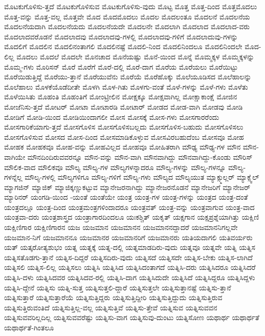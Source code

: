 {ಮೊಟಕುಗೊಳಿಸು-ತ್ತದೆ
ಮೊಟಕುಗೊಳಿಸುವ
ಮೊಟಕುಗೊಳಿಸು-ವುದು
ಮೊಟ್ಟ
ಮೊತ್ತ
ಮೊತ್ತ-ದಿಂದ
ಮೊತ್ತಮೊದಲು
ಮೊತ್ತ-ವನ್ನು
ಮೊತ್ತ-ವಲ್ಲ
ಮೊತ್ತವೇ
ಮೊದ
ಮೊದಮೊದಲು
ಮೊದಲ
ಮೊದಲಂತೂ
ಮೊದಲನೆ
ಮೊದಲನೆಯ
ಮೊದಲನೆಯದಾಗಿ
ಮೊದಲನೆಯದು
ಮೊದಲನೆಯದೇ
ಮೊದಲನೇ
ಮೊದಲಾಗಿ
ಮೊದಲಾದ
ಮೊದಲಾದ-ವರು
ಮೊದಲಾದವರೊಡನೆ
ಮೊದಲಾದವು
ಮೊದಲಾದವು-ಗಳಲ್ಲಿ
ಮೊದಲಾದವು-ಗಳಿಗೆ
ಮೊದಲಾದುವು-ಗಳನ್ನು
ಮೊದಲಿಗೆ
ಮೊದಲಿನ
ಮೊದಲಿನಂತಾಗಲಿ
ಮೊದಲಿನಷ್ಟೆ
ಮೊದಲಿ-ನಿಂದ
ಮೊದಲಿನಿಂದಲೂ
ಮೊದಲಿನಿಂದಲೇ
ಮೊದ-ಲಿಲ್ಲ
ಮೊದಲು
ಮೊದಲೆ
ಮೊದಲೇ
ಮೊನಚಾದ
ಮೊನೆಯಷ್ಟು
ಮೊನೆ-ಯಿಂದ
ಮೊನ್ನೆ
ಮೊಮ್ಮಕ್ಕಳ
ಮೊಮ್ಮಕ್ಕಳನ್ನು
ಮೊಮ್ಮ-ಗಳು
ಮೊರಿಸನ್
ಮೊರೆ
ಮೊರೆಗೆ
ಮೊರೆ-ದಲ್ಲಿ
ಮೊರೆ-ದಾಗ
ಮೊರೆಯ
ಮೊರೆಯಲು
ಮೊರೆಯಿಟ್ಟು
ಮೊರೆಯಿಡುತ್ತಿದ್ದೆ
ಮೊರೆಯು-ತ್ತಾನೆ
ಮೊರೆಯುವೆನು
ಮೊರೆಯೆ
ಮೊರೆಹೊಕ್ಕು
ಮೊಲೆಯೂಡಿಸದ
ಮೊಲೆಹಾಲನ್ನು
ಮೊಲೆಹಾಲು
ಮೊಳಕೆಯೊಡೆದೀತೇ
ಮೊಳಗಿ
ಮೊಳ-ಗಿತು
ಮೊಳಗು-ವಂತೆ
ಮೊಳೆ-ಗಳನ್ನು
ಮೊಳೆ-ಗಳು
ಮೊಳೆತು
ಮೊಳೆಯಿಸಿತು
ಮೊಹಂತಿ
ಮೊಹಂತಿಗೆ
ಮೋಂಟ್ರೀಲಿನ
ಮೋಕ್ಷಕ್ಕೂ
ಮೋಕ್ಷವಾಗಿಲ್ಲ
ಮೋಕ್ಷಾಕಾಂಕ್ಷೆ
ಮೋಜಿನ
ಮೋಜೆನಿಸು-ತ್ತದೆ
ಮೋಟರ್
ಮೋಟಾ
ಮೋಟಾರಡಿ
ಮೋಟಾರ್
ಮೋಡದ
ಮೋಡ-ವಾಗಿ
ಮೋಡವು
ಮೋಡಿ
ಮೋಡಿಗೆ
ಮೋಡಿ-ಯಿಂದ
ಮೋಡಿಯಿಂದಾಗಲೀ
ಮೋಸ
ಮೋಸಕ್ಕೆ
ಮೋಸ-ಗಳು
ಮೋಸಗಾರರೆಂದು
ಮೋಸಗಾರಿಕೆಯಾಗು-ತ್ತದೆ
ಮೋಸಗೊಳಿಸ
ಮೋಸಗೊಳಿಸಬಲ್ಲದು
ಮೋಸಗೊಳಿಸ-ಬಹುದು
ಮೋಸಗೊಳಿಸಲು
ಮೋಸಗೊಳಿಸುವ
ಮೋಸದ
ಮೋಸ-ದಿಂದ
ಮೋಸಮಾಡಿಕೊಳ್ಳುವ
ಮೋಸವಿರಬಹುದೆಂಬ
ಮೋಸವೂ
ಮೋಹ
ಮೋಹಕ
ಮೋಹಕವೂ
ಮೋಹ-ವನ್ನು
ಮೋಹವಿಲ್ಲದ
ಮೋಹವೂ
ಮೋಹಿತರಾಗಿ
ಮೌಢ್ಯ
ಮೌಢ್ಯ-ಗಳ
ಮೌನ
ಮೌನ-ವಾಗಿಯೇ
ಮೌನದಿಂದಿರುವವರನ್ನೂ
ಮೌನ-ವನ್ನು
ಮೌನ-ವಾಗಿ
ಮೌನವಾಗಿದ್ದು
ಮೌನವಾಗಿದ್ದು-ಕೊಂಡು
ಮೌರಿಸ್
ಮೌಲಿಕ-ವಾದ
ಮೌಲಿಕವೂ
ಮೌಲ್ಯ
ಮೌಲ್ಯ-ಗಳ
ಮೌಲ್ಯಗಳನ್ನಾದರೂ
ಮೌಲ್ಯ-ಗಳನ್ನು
ಮೌಲ್ಯ-ಗಳನ್ನೂ
ಮೌಲ್ಯ-ಗಳನ್ನೆಲ್ಲ
ಮೌಲ್ಯ-ಗಳಲ್ಲಿ
ಮೌಲ್ಯಗಳಿಗೂ
ಮೌಲ್ಯ-ಗಳಿಗೆ
ಮೌಲ್ಯ-ಗಳು
ಮೌಲ್ಯದ
ಮೌಲ್ಯಯುತ
ಮ್ಯಾಕ್ಸ್ಮುಲ್ಲರ್
ಮ್ಯಾಕ್ಸ್ವೆಲ್
ಮ್ಯಾಗಜಿನ್
ಮ್ಯಾಜಿಕ್
ಮ್ಯಾಜಿಕ್ಕಣ್ಣುಕಟ್ಟುವ
ಮ್ಯಾನೇಜರನಾಗಿದ್ದು
ಮ್ಯಾನೇಜರನೊಡನೆ
ಮ್ಯಾನೇಜರಿಗೆ
ಮ್ಯಾನೇಜರ್
ಮ್ಯಾರಿನರ್
ಯಂಗಡಿ-ಯಿಂದ
-ಯಂತೆ
ಯಂತೆಯೇ
ಯಂತ್ರ
ಯಂತ್ರ-ಗಳ
ಯಂತ್ರ-ಗಳನ್ನು
ಯಂತ್ರದ
ಯಂತ್ರ-ದಂತೆ
ಯಂತ್ರದಲ್ಲೂ
ಯಂತ್ರ-ದಿಂದ
ಯಂತ್ರಮಂತ್ರಗಳಿಂದಾದರೂ
ಯಂತ್ರವತ್
ಯಂತ್ರ-ವನ್ನು
ಯಂತ್ರವಾಗುವ
ಯಂತ್ರ-ವಾದ
ಯಂತ್ರವಾ-ದರು
ಯಂತ್ರಶಾಸ್ತ್ರದ
ಯಂತ್ರಾಗಾರದಿಂದಲೂ
ಯಃಕಶ್ಚಿತ್
ಯಕೃತ್
ಯಕ್ಷಗಾನ
ಯಕ್ಷಪ್ರಶ್ನೆಯಾಗಿತ್ತು
ಯಕ್ಷಿಣಿ
ಯಕ್ಷಿಣಿಗಾರ
ಯಕ್ಷಿಣಿಗಾರನ
ಯಜ
ಯಜಮಾನ
ಯಜಮಾನನ
ಯಜಮಾನನದ್ದಾದರೆ
ಯಜಮಾನನಿಗಲ್ಲವೇ
ಯಜಮಾನ-ನಿಗೆ
ಯಜಮಾನನೂ
ಯಜಮಾನರ
ಯಜಮಾನರಿಗೆ
ಯಜಮಾನರು
ಯತಿಯದಾಗಲಿ
ಯತಿವರ್ಯರು
ಯತ್
ಯತ್ಕರೋತ್ಯಶುಭಂ
ಯತ್ನ
ಯತ್ನಕ್ಕೆ
ಯತ್ನ-ದಲ್ಲಿ
ಯತ್ನಮಾಡದಿರು-ವುದು
ಯತ್ನವೂ
ಯತ್ನವೇ
ಯತ್ನಿ
ಯತ್ನಿಸ
ಯತ್ನಿಸತೊಡಗು-ತ್ತಾನೆ
ಯತ್ನಿಸ-ದಿದ್ದರೆ
ಯತ್ನಿಸದಿರು-ವುದು
ಯತ್ನಿಸದೆ
ಯತ್ನಿಸದೇ
ಯತ್ನಿಸ-ಬೇಕು
ಯತ್ನಿಸ-ಲಾಗಿದೆ
ಯತ್ನಿಸಲಿ
ಯತ್ನಿಸ-ಲಿಲ್ಲ
ಯತ್ನಿಸಲು
ಯತ್ನಿಸಿ
ಯತ್ನಿಸಿದ
ಯತ್ನಿಸಿದಂತಾಗದೆ
ಯತ್ನಿಸಿ-ದರು
ಯತ್ನಿಸಿದರೂ
ಯತ್ನಿಸಿದರೆ
ಯತ್ನಿಸಿ-ದಳು
ಯತ್ನಿಸಿದವರ
ಯತ್ನಿಸಿದವ-ರಲ್ಲಿ
ಯತ್ನಿಸಿ-ದಾಗ
ಯತ್ನಿಸಿದುದೇ
ಯತ್ನಿಸಿದೆ
ಯತ್ನಿಸಿದ್ದರೂ
ಯತ್ನಿಸಿದ್ದಳು
ಯತ್ನಿಸಿ-ದ್ದೇನೆ
ಯತ್ನಿಸು
ಯತ್ನಿ-ಸುತ್ತ
ಯತ್ನಿಸುತ್ತಲಿ-ದ್ದಾರೆ
ಯತ್ನಿಸುತ್ತಲೇ
ಯತ್ನಿಸುತ್ತಾನಷ್ಟೆ
ಯತ್ನಿಸು-ತ್ತಾನೆ
ಯತ್ನಿಸುತ್ತಾರೆ
ಯತ್ನಿಸುತ್ತಾರೆಯೆ
ಯತ್ನಿಸುತ್ತಿದ್ದರು
ಯತ್ನಿಸುತ್ತಿದ್ದೀರಿ
ಯತ್ನಿಸುತ್ತಿದ್ದುದು
ಯತ್ನಿಸುತ್ತಿರುವ
ಯತ್ನಿಸುತ್ತಿರುವಂತಿದೆ
ಯತ್ನಿಸುತ್ತಿಲ್ಲ-ವಲ್ಲ
ಯತ್ನಿಸುತ್ತಿವೆ
ಯತ್ನಿಸು-ತ್ತೇವೆ
ಯತ್ನಿಸುವ
ಯತ್ನಿಸುವವನ
ಯತ್ನಿಸುವವರಿಲ್ಲದಿಲ್ಲ
ಯತ್ನಿಸುವವರೆಷ್ಟು
ಯತ್ನಿಸು-ವಾಗ
ಯತ್ನಿಸುವು-ದುಂಟು
ಯತ್ನಿಸೋಣ
ಯಥಾರ್ಥ
ಯಥಾರ್ಥತೆ
ಯಥಾರ್ಥತೆ-ಗಿಂತಲೂ
}
